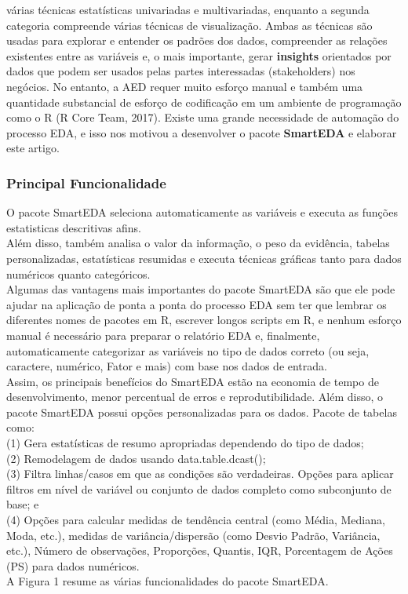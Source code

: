 \documentclass[
]{article}
\begin{document}
várias técnicas estatísticas univariadas e multivariadas, enquanto a
segunda categoria compreende várias técnicas de visualização. Ambas as
técnicas são usadas para explorar e entender os padrões dos dados,
compreender as relações existentes entre as variáveis e, o mais
importante, gerar \textbf{insights} orientados por dados que podem ser
usados pelas partes interessadas (stakeholders) nos negócios. No
entanto, a AED requer muito esforço manual e também uma quantidade
substancial de esforço de codificação em um ambiente de programação como
o R (R Core Team, 2017). Existe uma grande necessidade de automação do
processo EDA, e isso nos motivou a desenvolver o pacote
\textbf{SmartEDA} e elaborar este artigo.

\hypertarget{principal-funcionalidade}{%
\subsubsection{Principal
Funcionalidade}\label{principal-funcionalidade}}

O pacote SmartEDA seleciona automaticamente as variáveis e executa as
funções estatisticas descritivas afins.\\
Além disso, também analisa o valor da informação, o peso da evidência,
tabelas personalizadas, estatísticas resumidas e executa técnicas
gráficas tanto para dados numéricos quanto categóricos.\\
Algumas das vantagens mais importantes do pacote SmartEDA são que ele
pode ajudar na aplicação de ponta a ponta do processo EDA sem ter que
lembrar os diferentes nomes de pacotes em R, escrever longos scripts em
R, e nenhum esforço manual é necessário para preparar o relatório EDA e,
finalmente, automaticamente categorizar as variáveis no tipo de dados
correto (ou seja, caractere, numérico, Fator e mais) com base nos dados
de entrada.\\
Assim, os principais benefícios do SmartEDA estão na economia de tempo
de desenvolvimento, menor percentual de erros e reprodutibilidade. Além
disso, o pacote SmartEDA possui opções personalizadas para os dados.
Pacote de tabelas como:\\
(1) Gera estatísticas de resumo apropriadas dependendo do tipo de
dados;\\
(2) Remodelagem de dados usando data.table.dcast();\\
(3) Filtra linhas/casos em que as condições são verdadeiras. Opções para
aplicar filtros em nível de variável ou conjunto de dados completo como
subconjunto de base; e\\
(4) Opções para calcular medidas de tendência central (como Média,
Mediana, Moda, etc.), medidas de variância/dispersão (como Desvio
Padrão, Variância, etc.), Número de observações, Proporções, Quantis,
IQR, Porcentagem de Ações (PS) para dados numéricos.\\
A Figura 1 resume as várias funcionalidades do pacote SmartEDA.
\end{document}
